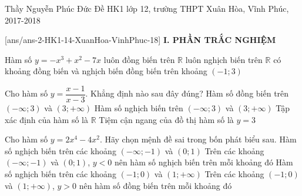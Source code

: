 	\begin{name}
	{Thầy Nguyễn Phúc Đức}
	{Đề HK1 lớp 12, trường THPT Xuân Hòa, Vĩnh Phúc, 2017-2018}
\end{name}
\setcounter{ex}{0}\setcounter{bt}{0}
[ans/ans-2-HK1-14-XuanHoa-VinhPhuc-18]
\noindent\textbf{I. PHẦN TRẮC NGHIỆM}
\begin{ex}%
	Hàm số $y=-x^3+x^2-7x$
	\choice
	{luôn đồng biến trên $\mathbb{R}$}
	{\True luôn nghịch biến trên $\mathbb{R}$}
	{có khoảng đồng biến và nghịch biến}
	{đồng biến trên khoảng $\left(-1;3\right)$}
\end{ex}
\begin{ex}%
	Cho hàm số $y=\dfrac{x-1}{x-3}$. Khẳng định nào sau đây đúng?
	\choice
	{Hàm số đồng biến trên $\left(-\infty;3\right)$ và $\left(3;+\infty\right)$}
	{\True Hàm số nghịch biến trên $\left(-\infty;3\right)$ và $\left(3;+\infty\right)$}
	{Tập xác định của hàm số là $\mathbb{R}$}
	{Tiệm cận ngang của đồ thị hàm số là $y = 3$}
\end{ex}
\begin{ex}%
	Cho hàm số $y=2x^4-4x^2$. Hãy chọn mệnh đề sai trong bốn phát biểu sau.
	\choice
	{Hàm số nghịch biến trên các khoảng $(-\infty;-1)$ và $\left(0;1\right)$}
	{Trên các khoảng $(-\infty;-1)$ và $\left(0;1\right)$, $y<0$ nên hàm số nghịch biến trên mỗi khoảng đó}
	{\True Hàm số nghịch biến trên các khoảng $(-1;0)$ và $(1;+\infty)$}
	{Trên các khoảng $\left(-1;0\right)$ và $(1;+\infty)$, $y > 0$ nên hàm số đồng biến trên mỗi khoảng đó}
\end{ex}
